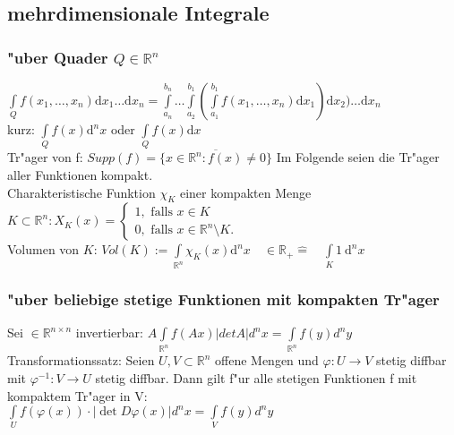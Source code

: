 \documentclass[10pt,a4paper^, twocolumn]{article}
\newcommand{\entspr}{\widehat{=}} %
\renewcommand{\phi}{\varphi} %
\renewcommand{\d}{\mathrm{d}} %
\newcommand{\R}{\mathbb{R}}
\begin{document}
\subsection{mehrdimensionale Integrale}
\subsubsection{"uber Quader $Q \in \R^n$}
	$\int\limits_Q f(x_1,\dots,x_n) \d x_1 \dots \d x_n = 
	\int\limits_{a_n}^{b_n} \dots \int\limits_{a_2}^{b_1} ( \int\limits_{a_1}^{b_1} f(x_1,\dots,x_n) \d x_1 ) \d x_2) \dots \d x_n$ \\
	kurz: $\int\limits_Q f(x) \d^n x$ oder $\int\limits_Q f(x) \d x$ \\
	Tr"ager von f: $Supp(f) = \overline{\{x \in \R^n : f(x) \neq 0\}}$ Im Folgende seien die Tr"ager aller Funktionen kompakt. \\
	Charakteristische Funktion $\chi_K$ einer kompakten Menge $K \subset \R^n:
	X_K(x) = \begin{cases}1, \text{  falls } x \in K \\ 0,  \text{   falls } x \in \R^n \setminus K.\end{cases}$ \\
	Volumen von $K$:  $Vol(K) := \int\limits_{\R^n} \chi_K(x) \d^n x \quad \in \R_+  \entspr \quad \int\limits_K 1 \ \d^n x$
\subsubsection{"uber beliebige stetige Funktionen mit kompakten Tr"ager}
	Sei $ \in \R^{n \times n}$ invertierbar: $A\int\limits_{\R^n} f(Ax) |det A| d^n x = \int\limits_{\R^n} f(y) d^n y$ \\
	Transformationssatz: Seien $U,V \subset \R^n$ offene Mengen und $\phi: U \to V$ stetig diffbar mit $\phi^{-1} : V \to U$ stetig diffbar.
	Dann gilt f"ur alle stetigen Funktionen f mit kompaktem Tr"ager in V: \\
	$\int\limits_U f(\phi(x)) \cdot \big| \det D \phi(x) \big| d^nx = \int\limits_V f(y) d^n y$
\end{document}
